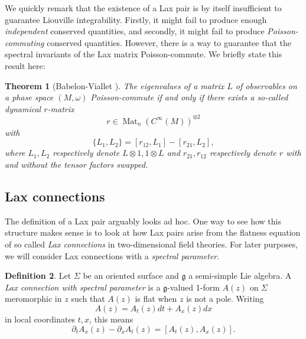 \documentclass[11pt]{report}
\newtheorem{theorem}{Theorem}[section]
\theoremstyle{definition}
\newtheorem{definition}[theorem]{Definition}
\theoremstyle{remark}
\theoremstyle{remark}
\begin{document}
We quickly remark that the existence of a Lax pair is by itself insufficient to guarantee Liouville integrability. Firstly, it might fail to produce enough \emph{independent} conserved quantities, and secondly, it might fail to produce \emph{Poisson-commuting} conserved quantities. However, there is a way to guarantee that the spectral invariants of the Lax matrix Poisson-commute. We briefly state this result here:

\begin{theorem}[Babelon-Viallet \cite{book:arutyunov:elements}]
The eigenvalues of a matrix $L$ of observables on a phase space $(M,\omega)$ Poisson-commute if and only if there exists a so-called \emph{dynamical $r$-matrix}
\begin{equation*}
r \in \operatorname{Mat}_n(C^\infty(M))^{\otimes 2}
\end{equation*}
with
\begin{equation*}
\{ L_1, L_2 \} = [r_{12},L_1] - [r_{21},L_2],
\end{equation*}
where $L_1,L_2$ respectively denote $L \otimes 1, 1 \otimes L$ and $r_{21},r_{12}$ respectively denote $r$ with and without the tensor factors swapped.
\end{theorem}

\subsection{Lax connections}

The definition of a Lax pair arguably looks ad hoc. One way to see how this structure makes sense is to look at how Lax pairs arise from the flatness equation of so called \emph{Lax connections} in two-dimensional field theories. For later purposes, we will consider Lax connections with a \emph{spectral parameter}.

\begin{definition}
Let $\Sigma$ be an oriented surface and $\mathfrak{g}$ a semi-simple Lie algebra. A \emph{Lax connection with spectral parameter} is a $\mathfrak{g}$-valued 1-form $A(z)$ on $\Sigma$ meromorphic in $z$ such that $A(z)$ is flat when $z$ is not a pole. Writing
\begin{equation*}
A(z) = A_t(z) dt + A_x(z) dx
\end{equation*}
in local coordinates $t,x$, this means
\begin{equation*}
\partial_t A_x(z) - \partial_x A_t(z) = [A_t(z),A_x(z)].
\end{equation*}
\end{definition}
\end{document}

